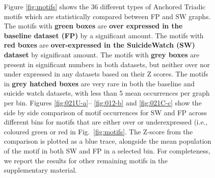 \begin{figure}
    
\caption{
Figure \ref{fig:motifs} shows the 36 different types of Anchored Triadic motifs which are statistically compared between FP and SW graphs. The motifs with \textbf{green boxes} are \textbf{over expressed in the baseline dataset (FP)} by a significant amount. The motifs with \textbf{red boxes} are \textbf{over-expressed in the SuicideWatch (SW) dataset} by significant amount. The motifs with \textbf{grey boxes} are present in significant numbers in both datasets, but neither over nor under expressed in any datasets based on their Z scores. The motifs in \textbf{grey hatched boxes} are very rare in both the baseline and suicide watch datasets, with less than 5 mean occurrences per graph per bin.
Figures \ref{fig:021U-a}--%
\ref{fig:012-b}  and \ref{fig:021C-c} show the side by side comparison of motif occurrences for SW and FP across different bins for motifs that are either over or underexpressed (i.e., coloured green or red in Fig.~\ref{fig:motifs}. The Z-score from the comparison is plotted as a blue trace, alongside the mean population of the motif in both SW and FP in a selected bin. For completeness, we report the results for other remaining motifs in the supplementary material.}
\label{Fig:motif_expressed}
\end{figure}